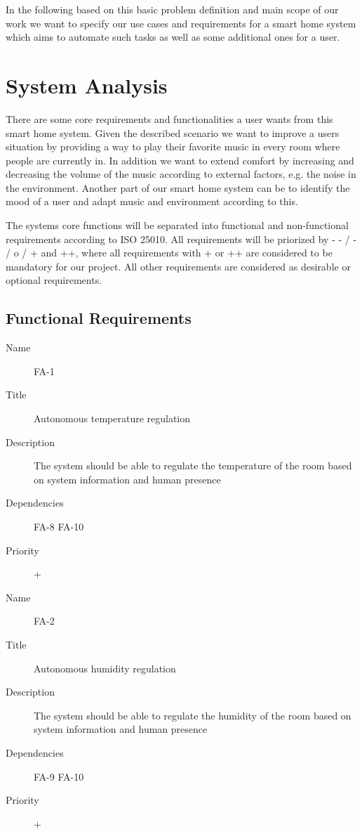 \documentclass[runningheads]{llncs}
\begin{document}
    In the following based on this basic problem definition and main scope of our work we want to specify our use cases and requirements for a smart home system which aims to automate such tasks as well as some additional ones for a user.


    \section{System Analysis}
    There are some core requirements and functionalities a user wants from this smart home system.
    Given the described scenario we want to improve a users situation by providing a way to play their favorite music in every room where people are currently in.
    In addition we want to extend comfort by increasing and decreasing the volume of the music according to external factors, e.g. the noise in the environment.
    Another part of our smart home system can be to identify the mood of a user and adapt music and environment according to this.

    The systems core functions will be separated into functional and non-functional requirements according to ISO 25010. All requirements will be priorized by - - / - / o / + and ++, where all requirements with + or ++ are considered to be mandatory for our project. All other requirements are considered as desirable or optional requirements.

    \subsection{Functional Requirements}

    \begin{description}
        \item[Name] FA-1
        \item[Title] Autonomous temperature regulation
        \item[Description] The system should be able to regulate the temperature of the room based on system information and human presence
        \item[Dependencies] FA-8 FA-10
        \item[Priority] +
    \end{description}

    \begin{description}
        \item[Name] FA-2
        \item[Title] Autonomous humidity regulation
        \item[Description] The system should be able to regulate the humidity of the room based on system information and human presence
        \item[Dependencies] FA-9 FA-10
        \item[Priority] +
    \end{description}
\end{document}
